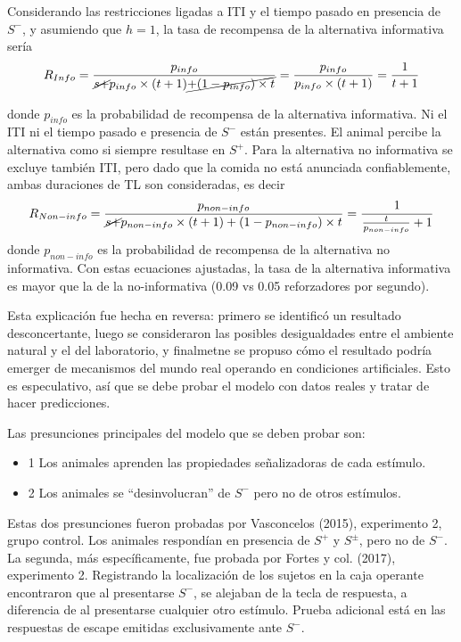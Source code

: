 \documentclass[a4paper,12pt]{article}
\begin{document}
Considerando las restricciones ligadas a ITI y el tiempo pasado en presencia de $S^-$, y asumiendo que $h=1$, la tasa de recompensa de la alternativa informativa sería 
$$R_{Info}=\frac{p_{info}}{\cancel{s+}p_{info}\times(t+1)\cancel{+(1-p_{info})\times t}}=\frac{p_{info}}{p_{info}\times(t+1)}=\frac{1}{t+1}$$

donde $p_{info}$ es la probabilidad de recompensa de la alternativa informativa. Ni el ITI ni el tiempo pasado e presencia de $S^-$ están presentes. El animal percibe la alternativa como si siempre resultase en $S^+$. Para la alternativa no informativa se excluye también ITI, pero dado que la comida no está anunciada confiablemente, ambas duraciones de TL son consideradas, es decir
$$R_{Non-info}=\frac{p_{non-info}}{\cancel{s+}p_{non-info}\times(t+1)+(1-p_{non-info})\times t}=\frac{1}{\frac{t}{p_{non-info}}+1}$$
donde $p_{non-info}$ es la probabilidad de recompensa de la alternativa no informativa. Con estas ecuaciones ajustadas, la tasa de la alternativa informativa es mayor que la de la no-informativa (0.09 vs 0.05 reforzadores por segundo).

Esta explicación fue hecha en reversa: primero se identificó un resultado desconcertante, luego se consideraron las posibles desigualdades entre el ambiente natural y el del laboratorio, y finalmetne se propuso cómo el resultado podría emerger de mecanismos del mundo real operando en condiciones artificiales. Esto es especulativo, así que se debe probar el modelo con datos reales y tratar de hacer predicciones.

Las presunciones principales del modelo que se deben probar son: 
\begin{itemize}
	\item 1 Los animales aprenden las propiedades señalizadoras de cada estímulo.
	\item 2 Los animales se ``desinvolucran'' de $S^-$ pero no de otros estímulos.
\end{itemize}

Estas dos presunciones fueron probadas por Vasconcelos (2015), experimento 2, grupo control. Los animales respondían en presencia de $S^+$ y $S^\pm$, pero no de $S^-$. La segunda, más específicamente, fue probada por Fortes y col. (2017), experimento 2. Registrando la localización de los sujetos en la caja operante encontraron que al presentarse $S^-$, se alejaban de la tecla de respuesta, a diferencia de al presentarse cualquier otro estímulo. Prueba adicional está en las respuestas de escape emitidas exclusivamente ante $S^-$.
\end{document}
